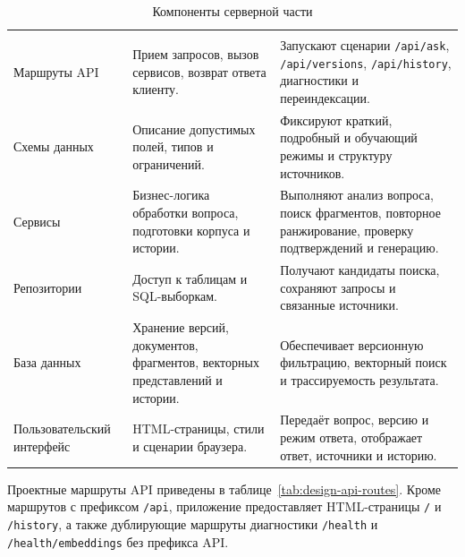 \begingroup
\centering
\small
{}\selectfont
\setlength{\tabcolsep}{4pt}
\begin{longtable}{|P{0.25\textwidth}|P{0.34\textwidth}|P{0.33\textwidth}|}
\caption{Компоненты серверной части}\label{tab:design-server-components}\\
\hline
{} &  &  \\ \hline
\endfirsthead
{}\\
\hline
\endhead
\endfoot
Маршруты API & Прием запросов, вызов сервисов, возврат ответа клиенту. & Запускают сценарии \texttt{/api/ask}, \texttt{/api/versions}, \texttt{/api/history}, диагностики и переиндексации. \\ \hline
Схемы данных & Описание допустимых полей, типов и ограничений. & Фиксируют краткий, подробный и обучающий режимы и структуру источников. \\ \hline
Сервисы & Бизнес-логика обработки вопроса, подготовки корпуса и истории. & Выполняют анализ вопроса, поиск фрагментов, повторное ранжирование, проверку подтверждений и генерацию. \\ \hline
Репозитории & Доступ к таблицам и SQL-выборкам. & Получают кандидаты поиска, сохраняют запросы и связанные источники. \\ \hline
База данных & Хранение версий, документов, фрагментов, векторных представлений и истории. & Обеспечивает версионную фильтрацию, векторный поиск и трассируемость результата. \\ \hline
Пользовательский интерфейс & HTML-страницы, стили и сценарии браузера. & Передаёт вопрос, версию и режим ответа, отображает ответ, источники и историю. \\ \hline
\end{longtable}
\par\endgroup

Проектные маршруты API приведены в таблице~\ref{tab:design-api-routes}. Кроме маршрутов с префиксом \texttt{/api}, приложение предоставляет HTML-страницы \texttt{/} и \texttt{/history}, а также дублирующие маршруты диагностики \texttt{/health} и \texttt{/health/embeddings} без префикса API.

